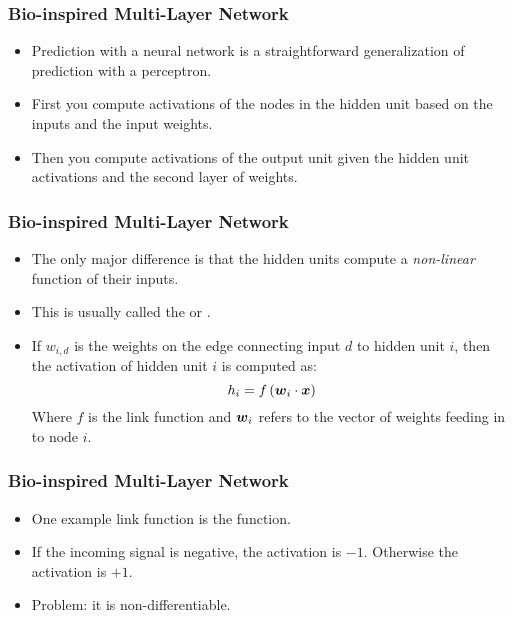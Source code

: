 \documentclass[trans]{beamer}
\begin{document}
\begin{frame}
  \frametitle{Bio-inspired Multi-Layer Network}
\begin{itemize}
\item 
Prediction with a neural network is a straightforward generalization
of prediction with a perceptron. 
\item  First you compute activations of the
nodes in the hidden unit based on the inputs and the input weights.
\item Then you compute activations of the output unit given the hidden unit
activations and the second layer of weights.
\end{itemize}
\end{frame}

\begin{frame}
  \frametitle{Bio-inspired Multi-Layer Network}
\begin{itemize}
\item 
The only major difference  is that the hidden units compute a \emph{non-linear}
function of their inputs.  
\item 
This is usually called the
 or . 
\item If $w_{i,d}$ is the weights on the edge connecting input $d$
to hidden unit $i$, then the activation of hidden unit $i$ is computed
as:
%
\begin{equation}
  h_i = f\left( {\boldsymbol{w}}_i \cdot {\boldsymbol{x}} \right)
\end{equation}
%
Where $f$ is the link function and ${\boldsymbol{w}}_i$ refers to the
vector of weights feeding in to node $i$.
\end{itemize}
\end{frame}

\begin{frame}
  \frametitle{Bio-inspired Multi-Layer Network}
\begin{itemize}
\item 
One example link function is the  function. 
\item If
the incoming signal is negative, the activation is $-1$.  Otherwise
the activation is $+1$.  
\item Problem: it
is non-differentiable.
\end{itemize}
\end{frame}
\end{document}
